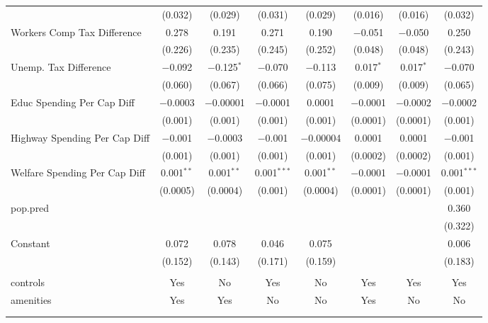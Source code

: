 \begin{table}[!htbp]
\begin{tabular}{@{\extracolsep{5pt}}lccccccc}
  & (0.032) & (0.029) & (0.031) & (0.029) & (0.016) & (0.016) & (0.032) \\ 
  Workers Comp Tax Difference & 0.278 & 0.191 & 0.271 & 0.190 & $-$0.051 & $-$0.050 & 0.250 \\ 
  & (0.226) & (0.235) & (0.245) & (0.252) & (0.048) & (0.048) & (0.243) \\ 
  Unemp. Tax Difference & $-$0.092 & $-$0.125$^{*}$ & $-$0.070 & $-$0.113 & 0.017$^{*}$ & 0.017$^{*}$ & $-$0.070 \\ 
  & (0.060) & (0.067) & (0.066) & (0.075) & (0.009) & (0.009) & (0.065) \\ 
  Educ Spending Per Cap Diff & $-$0.0003 & $-$0.00001 & $-$0.0001 & 0.0001 & $-$0.0001 & $-$0.0002 & $-$0.0002 \\ 
  & (0.001) & (0.001) & (0.001) & (0.001) & (0.0001) & (0.0001) & (0.001) \\ 
  Highway Spending Per Cap Diff & $-$0.001 & $-$0.0003 & $-$0.001 & $-$0.00004 & 0.0001 & 0.0001 & $-$0.001 \\ 
  & (0.001) & (0.001) & (0.001) & (0.001) & (0.0002) & (0.0002) & (0.001) \\ 
  Welfare Spending Per Cap Diff & 0.001$^{**}$ & 0.001$^{**}$ & 0.001$^{***}$ & 0.001$^{**}$ & $-$0.0001 & $-$0.0001 & 0.001$^{***}$ \\ 
  & (0.0005) & (0.0004) & (0.001) & (0.0004) & (0.0001) & (0.0001) & (0.001) \\ 
  pop.pred &  &  &  &  &  &  & 0.360 \\ 
  &  &  &  &  &  &  & (0.322) \\ 
  Constant & 0.072 & 0.078 & 0.046 & 0.075 &  &  & 0.006 \\ 
  & (0.152) & (0.143) & (0.171) & (0.159) &  &  & (0.183) \\ 
 \hline \\[-1.8ex] 
controls & Yes & No & Yes & No & Yes & Yes & Yes \\ 
amenities & Yes & Yes & No & No & Yes & No & No \\ 
\hline \\[-1.8ex] 
\hline 
\hline \\[-1.8ex] 
\end{tabular} 
\end{table} 
